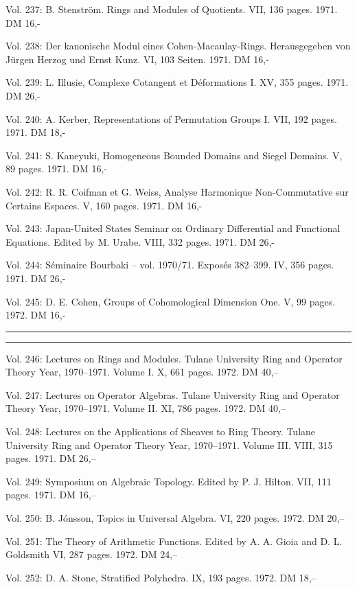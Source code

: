 Vol. 237: B. Stenström. Rings and Modules of Quotients. VII, 136 pages. 1971. DM 16,-

Vol. 238: Der kanonische Modul eines Cohen-Macaulay-Rings. Herausgegeben von Jürgen Herzog und Ernst Kunz. VI, 103 Seiten. 1971. DM 16,-

Vol. 239: L. Illusie, Complexe Cotangent et Déformations I. XV, 355 pages. 1971. DM 26,-

Vol. 240: A. Kerber, Representations of Permutation Groups I. VII, 192 pages. 1971. DM 18,-

Vol. 241: S. Kaneyuki, Homogeneous Bounded Domains and Siegel Domains. V, 89 pages. 1971. DM 16,-

Vol. 242: R. R. Coifman et G. Weiss, Analyse Harmonique Non-Commutative sur Certains Espaces. V, 160 pages. 1971. DM 16,-

Vol. 243: Japan-United States Seminar on Ordinary Differential and Functional Equations. Edited by M. Urabe. VIII, 332 pages. 1971. DM 26,-

Vol. 244: Séminaire Bourbaki -- vol. 1970/71. Exposés 382--399. IV, 356 pages. 1971. DM 26,-

Vol. 245: D. E. Cohen, Groups of Cohomological Dimension One. V, 99 pages. 1972. DM 16,-

\noindent\rule{\linewidth}{0.4pt}



\noindent\rule{\linewidth}{0.4pt}

Vol. 246: Lectures on Rings and Modules. Tulane University Ring and Operator Theory Year, 1970--1971. Volume I. X, 661 pages. 1972. DM 40,--

Vol. 247: Lectures on Operator Algebras. Tulane University Ring and Operator Theory Year, 1970--1971. Volume II. XI, 786 pages. 1972. DM 40,--

Vol. 248: Lectures on the Applications of Sheaves to Ring Theory. Tulane University Ring and Operator Theory Year, 1970--1971. Volume III. VIII, 315 pages. 1971. DM 26,--

Vol. 249: Symposium on Algebraic Topology. Edited by P. J. Hilton. VII, 111 pages. 1971. DM 16,--

Vol. 250: B. Jónsson, Topics in Universal Algebra. VI, 220 pages. 1972. DM 20,--

Vol. 251: The Theory of Arithmetic Functions. Edited by A. A. Gioia and D. L. Goldsmith VI, 287 pages. 1972. DM 24,--

Vol. 252: D. A. Stone, Stratified Polyhedra. IX, 193 pages. 1972. DM 18,--

